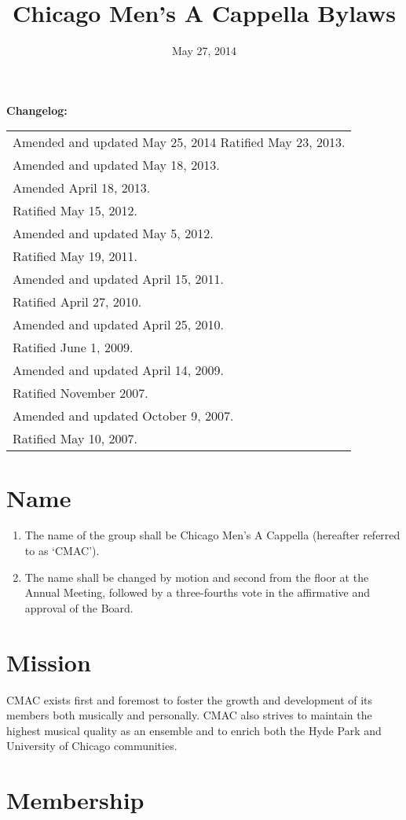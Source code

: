 \documentclass{article}
\title{Chicago Men's A Cappella Bylaws}
\date{May 27, 2014}
\providecommand{\tabularnewline}{\\}
\begin{document}
\maketitle

\noindent \textbf{Changelog:} \\
\begin{tabular}{l}
Amended and updated May 25, 2014
Ratified May 23, 2013. \tabularnewline
Amended and updated May 18, 2013. \tabularnewline
Amended April 18, 2013. \tabularnewline
Ratified May 15, 2012. \tabularnewline
Amended and updated May 5, 2012. \tabularnewline
Ratified May 19, 2011. \tabularnewline
Amended and updated April 15, 2011. \tabularnewline
Ratified April 27, 2010. \tabularnewline
Amended and updated April 25, 2010. \tabularnewline
Ratified June 1, 2009. \tabularnewline
Amended and updated April 14, 2009. \tabularnewline
Ratified November 2007. \tabularnewline
Amended and updated October 9, 2007. \tabularnewline
Ratified May 10, 2007. \tabularnewline
\end{tabular}

\noindent \newpage{}

\tableofcontents{}

\newpage{}
\section{Name}
\begin{enumerate}
\item The name of the group shall be Chicago Men's A Cappella (hereafter
referred to as `CMAC').
\item The name shall be changed by motion and second from the floor at the
Annual Meeting, followed by a three-fourths vote in the affirmative
and approval of the Board.
\end{enumerate}

\section{Mission}

CMAC exists first and foremost to foster the growth and development
of its members both musically and personally. CMAC also strives to
maintain the highest musical quality as an ensemble and to enrich
both the Hyde Park and University of Chicago communities.

\section{Membership}
\end{document}
